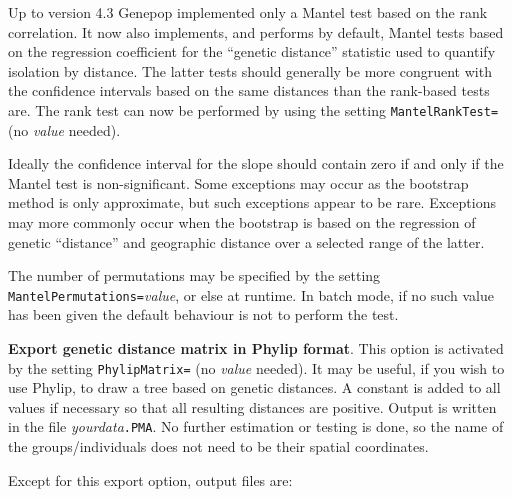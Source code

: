\documentclass[12pt,]{book}
\begin{document}
Up to version 4.3 Genepop implemented only a Mantel test based on the
rank correlation. It now also implements, and performs by default,
Mantel tests based on the regression coefficient for the ``genetic
distance'' statistic used to quantify isolation by distance. The latter
tests should generally be more congruent with the confidence intervals
based on the same distances than the rank-based tests are. The rank test
can now be performed by using the setting \texttt{MantelRankTest=} (no
\emph{value} needed).

Ideally the confidence interval for the slope should contain zero if and
only if the Mantel test is non-significant. Some exceptions may occur as
the bootstrap method is only approximate, but such exceptions appear to
be rare. Exceptions may more commonly occur when the bootstrap is based
on the regression of genetic ``distance'' and geographic distance over a
selected range of the latter.

The number of permutations may be specified by the setting
\texttt{MantelPermutations=}\emph{value},
or else at runtime. In batch mode, if no such value has been given the
default behaviour is not to perform the test.

\textbf{Export genetic distance matrix in Phylip
format}. This option is activated
by the setting \texttt{PhylipMatrix=} (no \emph{value}
needed). It may be useful, if you wish to
use Phylip, to draw a tree based on genetic distances. A constant is
added to all values if necessary so that all resulting distances are
positive. Output is written in the file \emph{yourdata}\texttt{.PMA}. No
further estimation or testing is done, so the name of the
groups/individuals does not need to be their spatial coordinates.

Except for this export option, output files are:
\end{document}
